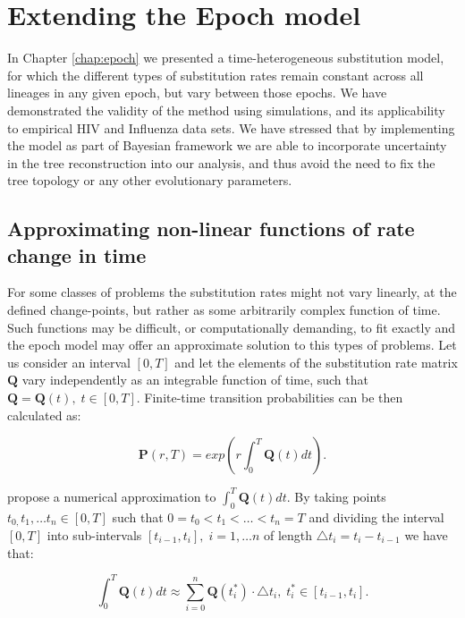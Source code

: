\section{Extending the Epoch model}

In Chapter \ref{chap:epoch} we presented a time-heterogeneous substitution model, for which the different types of substitution rates %
remain constant across all lineages in any given epoch, but vary between those epochs.
We have demonstrated the validity of the method using simulations, and its applicability to empirical HIV and Influenza data sets.
We have stressed that by implementing the model as part of Bayesian framework we are able to incorporate uncertainty in the tree reconstruction into our analysis, and thus avoid the need to fix the tree topology or any other evolutionary parameters.

\subsection{Approximating non-linear functions of rate change in time\label{sub:nonlinear}}

For some classes of problems the substitution rates might not vary linearly, at the defined change-points, but rather as some arbitrarily complex function of time. 
Such functions may be difficult, or computationally demanding, to fit exactly and the epoch model may offer an approximate solution to this types of problems.
Let us consider an interval $\left[0,T\right]$ and let the elements of the substitution rate matrix $\mathbf{Q}$ vary independently as an integrable function of time, such that $\mathbf{Q}=\mathbf{Q}(t),\; t\in\left[0,T\right]$. 
Finite-time transition probabilities can be then calculated as: 

\begin{equation}
\ensuremath{\mathbf{P}}(r,T)=exp\left(r\int_{0}^{T}\mathbf{Q}(t)dt\right).\label{eq:rodrigo}
\end{equation}

\noindent
\citet{Rodrigo2008} propose a numerical approximation to $\int_{0}^{T}\mathbf{Q}(t)dt$. 
By taking points $t_{0,}t_{1},\ldots t_{n}\in[0,T]$ such that $0=t_{0}<t_{1}<\ldots<t_{n}=T$ and dividing the interval $\left[0,T\right]$ into sub-intervals $\left[t_{i-1},t_{i}\right],\; i=1,\ldots n$ of length $\triangle t_{i}=t_{i}-t_{i-1}$ we have that:   

\begin{equation}
\int_{0}^{T}\mathbf{Q}(t)dt\approx\underset{i=0}{\overset{n}{\sum}}\mathbf{Q}(t_{i}^{*})\cdot\triangle t_{i},\; t_{i}^{*}\in[t_{i-1},t_{i}].\label{eq:approx}
\end{equation}

